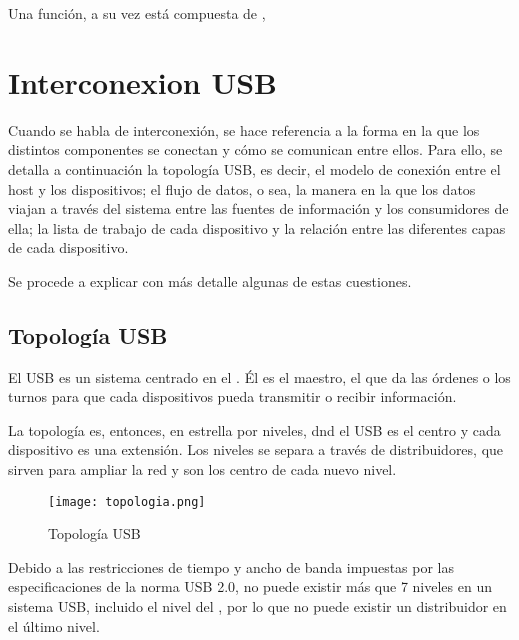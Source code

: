   Una función, a su vez está compuesta de \eps, 

  \section{Interconexion USB}
  Cuando se habla de interconexión, se hace referencia a la forma en la que los
  distintos componentes se conectan y cómo se comunican entre ellos. Para ello,
  se detalla a continuación la topología USB, es decir, el modelo de conexión
  entre el host y los dispositivos; el flujo de datos, o sea, la manera en la
  que los datos viajan a través del sistema entre las fuentes de información y
  los consumidores de ella; la lista de trabajo de cada dispositivo y la
  relación entre las diferentes capas de cada dispositivo.

  Se procede a explicar con más detalle algunas de estas cuestiones.

    \subsection{Topología USB}
    El USB es un sistema centrado en el \host. Él es el maestro, el que da las
    órdenes o los turnos para que cada dispositivos pueda transmitir o recibir
    información.

    La topología es, entonces, en estrella por niveles, dnd el \host USB es el
    centro y cada dispositivo es una extensión. Los niveles se separa a través
    de distribuidores, que sirven para ampliar la red y son los centro de cada
    nuevo nivel.

    \begin{figure}
	    \centering
		\texttt{[image: topologia.png]}
		\caption{Topología USB}
		\label{}
    \end{figure}

    Debido a las restricciones de tiempo y ancho de banda impuestas por las
    especificaciones de la norma USB 2.0, no puede existir más que 7 niveles
    en un sistema USB, incluido el nivel del \host, por lo que no puede existir
    un distribuidor en el último nivel.



